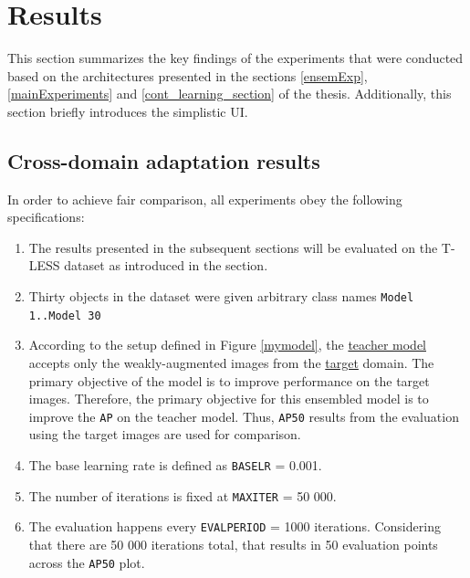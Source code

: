 

\section{Results} 
\label{results} 
This section summarizes the key findings of the experiments that were conducted based on the architectures presented in the sections \ref{ensemExp},  \ref{mainExperiments} and \ref{cont_learning_section} of the thesis. Additionally, this section briefly introduces the simplistic UI. 

\subsection{Cross-domain adaptation results}

In order to achieve fair comparison, all experiments obey the following specifications:
\begin{enumerate}
\item The results presented in the subsequent sections will be evaluated on the T-LESS dataset as introduced in the  section. 
\item Thirty objects in the dataset were given arbitrary class names  \texttt{Model 1..Model 30}
\item According to the setup defined in Figure \ref{mymodel}, the \underline{teacher model} accepts only the weakly-augmented images from the \underline{target} domain. The primary objective of the model is to improve performance on the target images. Therefore, the primary objective for this ensembled model is to improve the \texttt{AP} on the teacher model. Thus, \texttt{AP50} results from the evaluation using the target images are used for comparison. 
\item The base learning rate is defined as \texttt{BASE\textunderscore LR} = 0.001.
\item The number of iterations is fixed at \texttt{MAX\textunderscore ITER} = 50 000.
\item The evaluation happens every \texttt{EVAL\textunderscore PERIOD} = 1000 iterations. Considering that there are 50 000 iterations total, that results in 50 evaluation points across the \texttt{AP50} plot.
\end{enumerate}  


